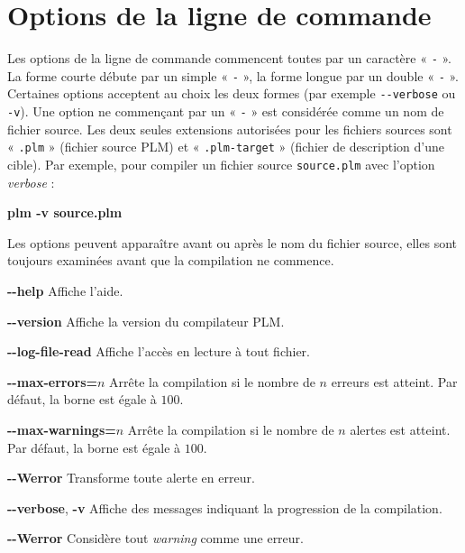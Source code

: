 

\newcommand\OPTION[1]{\colorbox{gray!15}{\ttfamily\bfseries #1}}


\chapter{Options de la ligne de commande}

Les options de la ligne de commande commencent toutes par un caractère « \texttt{-} ». La forme courte débute par un simple « \texttt{-} », la forme longue par un double « \texttt{-} ». Certaines options acceptent au choix les deux formes (par exemple \texttt{-{}-verbose} ou \texttt{-v}). Une option ne commençant par un « \texttt{-} » est considérée comme un nom de fichier source. Les deux seules extensions autorisées pour les fichiers sources sont « \texttt{.plm} » (fichier source PLM) et  « \texttt{.plm-target} » (fichier de description d'une cible). Par exemple, pour compiler un fichier source \texttt{source.plm} avec l'option \emph{verbose} :

\begin{SHELL}
\bfseries plm -v source.plm
\end{SHELL}

Les options peuvent apparaître avant ou après le nom du fichier source, elles sont toujours examinées avant que la compilation ne commence.



\OPTION{-{}-help} Affiche l'aide.


\OPTION{-{}-version} Affiche la version du compilateur PLM.



\OPTION{-{}-log-file-read} Affiche l'accès en lecture à tout fichier.

\OPTION{-{}-max-errors=$n$} Arrête la compilation si le nombre de $n$ erreurs est atteint. Par défaut, la borne est égale à $100$.

\OPTION{-{}-max-warnings=$n$} Arrête la compilation si le nombre de $n$ alertes est atteint. Par défaut, la borne est égale à $100$.

\OPTION{-{}-Werror} Transforme toute alerte en erreur.

\OPTION{-{}-verbose}, \OPTION{-v} Affiche des messages indiquant la progression de la compilation.

\OPTION{-{}-Werror} Considère tout \emph{warning} comme une erreur.

